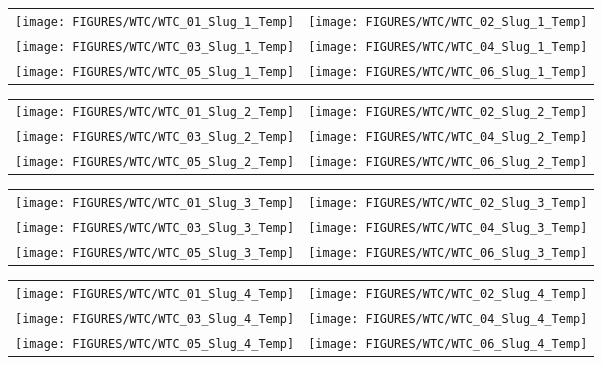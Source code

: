 \begin{figure}[p]
\begin{tabular*}{\textwidth}{l@{\extracolsep{\fill}}r}
\texttt{[image: FIGURES/WTC/WTC\_01\_Slug\_1\_Temp]} &
\texttt{[image: FIGURES/WTC/WTC\_02\_Slug\_1\_Temp]} \\
\texttt{[image: FIGURES/WTC/WTC\_03\_Slug\_1\_Temp]} &
\texttt{[image: FIGURES/WTC/WTC\_04\_Slug\_1\_Temp]} \\
\texttt{[image: FIGURES/WTC/WTC\_05\_Slug\_1\_Temp]} &
\texttt{[image: FIGURES/WTC/WTC\_06\_Slug\_1\_Temp]}
\end{tabular*}
\label{NIST_WTC_Slug_1_Temp}
\end{figure}

\begin{figure}[p]
\begin{tabular*}{\textwidth}{l@{\extracolsep{\fill}}r}
\texttt{[image: FIGURES/WTC/WTC\_01\_Slug\_2\_Temp]} &
\texttt{[image: FIGURES/WTC/WTC\_02\_Slug\_2\_Temp]} \\
\texttt{[image: FIGURES/WTC/WTC\_03\_Slug\_2\_Temp]} &
\texttt{[image: FIGURES/WTC/WTC\_04\_Slug\_2\_Temp]} \\
\texttt{[image: FIGURES/WTC/WTC\_05\_Slug\_2\_Temp]} &
\texttt{[image: FIGURES/WTC/WTC\_06\_Slug\_2\_Temp]}
\end{tabular*}
\label{NIST_WTC_Slug_2_Temp}
\end{figure}

\begin{figure}[p]
\begin{tabular*}{\textwidth}{l@{\extracolsep{\fill}}r}
\texttt{[image: FIGURES/WTC/WTC\_01\_Slug\_3\_Temp]} &
\texttt{[image: FIGURES/WTC/WTC\_02\_Slug\_3\_Temp]} \\
\texttt{[image: FIGURES/WTC/WTC\_03\_Slug\_3\_Temp]} &
\texttt{[image: FIGURES/WTC/WTC\_04\_Slug\_3\_Temp]} \\
\texttt{[image: FIGURES/WTC/WTC\_05\_Slug\_3\_Temp]} &
\texttt{[image: FIGURES/WTC/WTC\_06\_Slug\_3\_Temp]}
\end{tabular*}
\label{NIST_WTC_Slug_3_Temp}
\end{figure}

\begin{figure}[p]
\begin{tabular*}{\textwidth}{l@{\extracolsep{\fill}}r}
\texttt{[image: FIGURES/WTC/WTC\_01\_Slug\_4\_Temp]} &
\texttt{[image: FIGURES/WTC/WTC\_02\_Slug\_4\_Temp]} \\
\texttt{[image: FIGURES/WTC/WTC\_03\_Slug\_4\_Temp]} &
\texttt{[image: FIGURES/WTC/WTC\_04\_Slug\_4\_Temp]} \\
\texttt{[image: FIGURES/WTC/WTC\_05\_Slug\_4\_Temp]} &
\texttt{[image: FIGURES/WTC/WTC\_06\_Slug\_4\_Temp]}
\end{tabular*}
\label{NIST_WTC_Slug_4_Temp}
\end{figure}

